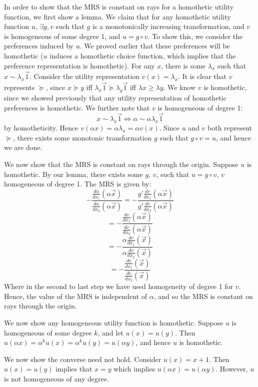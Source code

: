 \documentclass[10pt,letter]{article}
\begin{document}
In order to show that the MRS is constant on rays for a homothetic utility function, we first show a lemma. We claim that for any homothetic utility function $u$, $\exists g, v$ such that $g$ is a monotonically increasing transformation, and $v$ is homogeneous of some degree 1, and $u = g \circ v$. To show this, we consider the preferences induced by $u$. We proved earlier that these preferences will be homothetic ($u$ induces a homothetic choice function, which implies that the preference representation is homothetic). For any $x$, there is some $\lambda_x$ such that $x \sim \lambda_x \vec{1}$. Consider the utility representation $v(x) = \lambda_x$. It is clear that $v$ represents $\succeq$, since
$x \succeq y$ iff $\lambda_x \vec{1} \succeq \lambda_y \vec{1} $ iff $\lambda x \ge \lambda y$. We know $v$ is homothetic, since we showed previously that any utility representation of homothetic preferences is homothetic. We further note that $v$ is homogeneous of degree 1:
\[ x \sim \lambda_x \vec{1} \iff \alpha \sim \alpha \lambda_x \vec{1} \]
by homotheticity. Hence $v(\alpha x) = \alpha \lambda_x = \alpha v(x)$. Since $u$ and $v$ both represent $\succeq$, there exists some monotonic transformation $g$ such that $g\circ v = u$, and hence we are done.

We now show that the MRS is constant on rays through the origin. Suppose $u$ is homothetic. By our lemma, there exists some $g$, $v$, such that $u = g \circ v$, $v$ homogeneous of degree 1. The MRS is given by:
\[ - \frac{\frac{du}{dx_1}(\alpha \vec{x})}{\frac{du}{dx_2}(\alpha \vec{x})} = -\frac{g' \frac{dv}{dx_1}(\alpha \vec{x})}{g' \frac{dv}{dx_2}(\alpha \vec{x})} \]
\[ = - \frac{\frac{dv}{dx_1}(\alpha \vec{x})}{\frac{dv}{dx_2}(\alpha \vec{x})} \]
\[ = - \frac{\alpha \frac{dv}{dx_1}(\vec{x})}{\alpha \frac{dv}{dx_2}(\vec{x})} \]
\[ = - \frac{\frac{dv}{dx_1}(\vec{x})}{\frac{dv}{dx_2}(\vec{x})} \]
Where in the second to last step we have used homogeneity of degree 1 for $v$. Hence, the value of the MRS is independent of $\alpha$, and so the MRS is constant on rays through the origin.

We now show any homogeneous utility function is homothetic. Suppose $u$ is homogeneous of some degree $k$, and let $u(x) = u(y)$. Then $u(\alpha x) = \alpha^k u(x) = \alpha^k u(y) = u(\alpha y)$, and hence $u$ is homothetic.

We now show the converse need not hold. Consider $u(x) = x + 1$. Then $u(x) = u(y)$ implies that $x = y$ which implies $u(\alpha x) = u(\alpha y)$. However, $u$ is not homogeneous of any degree.
\end{document}

